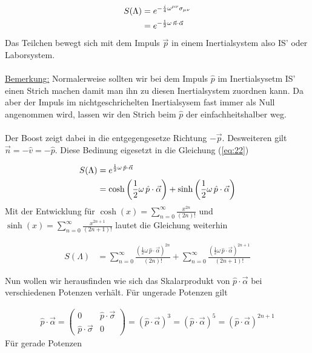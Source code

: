 \begin{align}
  \label{eq:22}
  S(\Lambda) &= e^{-\frac{i}{4}\omega^{\mu\nu}\sigma_{\mu\nu}} \notag \\
&=e^{-\frac{1}{2}\omega\,\vec n\cdot\vec \alpha  }
\end{align}
Das Teilchen bewegt sich mit dem Impuls \(\vec p\) in einem Inertialsystem also IS' oder Laborsystem.\\
\\
\underline{Bemerkung:} Normalerweise sollten wir bei dem Impuls \(\hat p\) im Inertialsysetm IS' einen Strich machen damit man ihn zu diesen Inertialsystem zuordnen kann. Da aber der Impuls im nichtgeschrichelten Inertialsysem fast immer als Null angenommen wird, lassen wir den Strich beim \(\hat p\) der einfachheitshalber weg.\\
\\
Der Boost zeigt dabei in die entgegengesetze Richtung \(-\vec p\). Desweiteren gilt \(\vec n = - \hat v = - \hat p \). Diese Bedinung eigesetzt in die Gleichung (\ref{eq:22})

\begin{align}
  \label{eq:23}
  S(\Lambda) &=e^{\frac{1}{2}\omega\,\hat p\cdot\vec \alpha  } \notag \\
&= \cosh\left(\frac{1}{2}\omega\,\hat p\cdot\vec \alpha\right) + \sinh\left(\frac{1}{2}\omega\,\hat p\cdot\vec \alpha \right)
\end{align}
Mit der Entwicklung für \(\cosh(x) = \sum_{n=0}^{\infty}\frac{x^{2n}}{(2n)!}\) und  \(\sinh(x) = \sum_{n=0}^{\infty}\frac{x^{2n+1}}{(2n+1)!}\) lautet die Gleichung weiterhin

\begin{align}
  \label{eq:24}
  S(\Lambda) &=\sum_{n=0}^{\infty}\frac{\left(\frac{1}{2}\omega\,\hat p\cdot\vec \alpha\right)^{2n}}{(2n)!} + \sum_{n=0}^{\infty}\frac{\left(\frac{1}{2}\omega\,\hat p\cdot\vec \alpha\right)^{2n+1}}{(2n+1)!}
\end{align}

Nun wollen wir herausfinden wie sich das Skalarprodukt von \(\hat p\cdot\vec \alpha\) bei verschiedenen Potenzen verhält. Für ungerade Potenzen gilt

\begin{align}
  \label{eq:25}
  \hat p\cdot\vec \alpha =
  \begin{pmatrix}
    0&\hat p\cdot\vec \sigma\\
    \hat p\cdot\vec \sigma&0
  \end{pmatrix} = (\hat p\cdot\vec \alpha)^3 =(\hat p\cdot\vec \alpha)^5 = (\hat p\cdot\vec \alpha)^{2n+1}
\end{align}
Für gerade Potenzen

